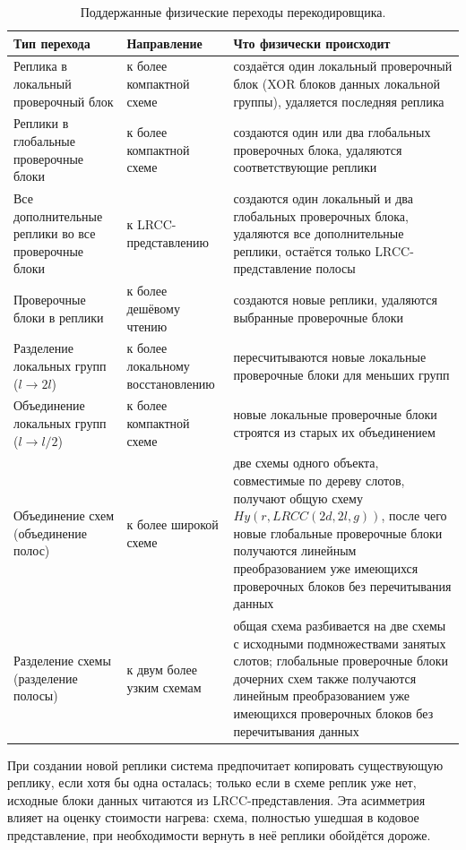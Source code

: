 \begin{center}
\begin{longtable}{|p{}|p{}|p{}|}
\caption{\label{tab:implementation-transitions}
Поддержанные физические переходы перекодировщика.}\\
\hline
Тип перехода & Направление & Что физически происходит \\
\hline
Реплика в локальный проверочный блок & к более компактной схеме & создаётся один локальный проверочный блок (XOR блоков данных локальной группы), удаляется последняя реплика \\
\hline
Реплики в глобальные проверочные блоки & к более компактной схеме & создаются один или два глобальных проверочных блока, удаляются соответствующие реплики \\
\hline
Все дополнительные реплики во все проверочные блоки & к LRCC-представлению & создаются один локальный и два глобальных проверочных блока, удаляются все дополнительные реплики, остаётся только LRCC-представление полосы \\
\hline
Проверочные блоки в реплики & к более дешёвому чтению & создаются новые реплики, удаляются выбранные проверочные блоки \\
\hline
Разделение локальных групп ($l \to 2l$) & к более локальному восстановлению & пересчитываются новые локальные проверочные блоки для меньших групп \\
\hline
Объединение локальных групп ($l \to l/2$) & к более компактной схеме & новые локальные проверочные блоки строятся из старых их объединением \\
\hline
Объединение схем (объединение полос) & к более широкой схеме & две схемы одного объекта, совместимые по дереву слотов, получают общую схему $Hy(r, LRCC(2d,2l,g))$, после чего новые глобальные проверочные блоки получаются линейным преобразованием уже имеющихся проверочных блоков без перечитывания данных \\
\hline
Разделение схемы (разделение полосы) & к двум более узким схемам & общая схема разбивается на две схемы с исходными подмножествами занятых слотов; глобальные проверочные блоки дочерних схем также получаются линейным преобразованием уже имеющихся проверочных блоков без перечитывания данных \\
\hline
\end{longtable}
\end{center}

При создании новой реплики система предпочитает копировать существующую реплику,
если хотя бы одна осталась; только если в схеме реплик уже нет, исходные блоки
данных читаются из LRCC-представления. Эта асимметрия влияет на оценку
стоимости нагрева: схема, полностью ушедшая в кодовое представление, при
необходимости вернуть в неё реплики обойдётся дороже.

